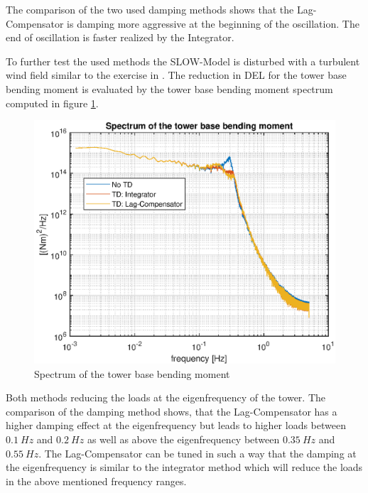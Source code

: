 The comparison of the two used damping methods shows that the Lag-Compensator is damping more aggressive at the beginning of the oscillation. The end of oscillation is faster realized by the Integrator.   

To further test the used methods the SLOW-Model is disturbed with a turbulent wind field similar to the exercise in \cite{SchlipfLecture}. The reduction in DEL for the tower base bending moment is evaluated by the tower base bending moment spectrum computed in figure \ref{fig:TDDEL}.

\begin{figure}[h]
	\centering	
	\includegraphics[width=12cm]{Figures/TDSpectrum.eps}
	\caption{Spectrum of the tower base bending moment}
	\label{fig:TDDEL}
\end{figure}
  
Both methods reducing the loads at the eigenfrequency of the tower. The comparison of the damping method shows, that the Lag-Compensator has a higher damping effect at the eigenfrequency but leads to higher loads between $\SI{0.1}{Hz}$ and $\SI{0.2}{Hz}$ as well as above the eigenfrequency between $\SI{0.35}{Hz}$ and $\SI{0.55}{Hz}$. The Lag-Compensator can be tuned in such a way that the damping at the eigenfrequency is similar to the integrator method which will reduce the loads in the above mentioned frequency ranges.
    